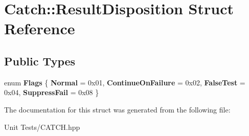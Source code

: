 \hypertarget{structCatch_1_1ResultDisposition}{}\section{Catch\+:\+:Result\+Disposition Struct Reference}
\label{structCatch_1_1ResultDisposition}
\subsection*{Public Types}
\begin{DoxyCompactItemize}
\item 
enum {\bfseries Flags} \{ {\bfseries Normal} = 0x01, 
{\bfseries Continue\+On\+Failure} = 0x02, 
{\bfseries False\+Test} = 0x04, 
{\bfseries Suppress\+Fail} = 0x08
 \}\hypertarget{structCatch_1_1ResultDisposition_a3396cad6e2259af326b3aae93e23e9d8}{}\label{structCatch_1_1ResultDisposition_a3396cad6e2259af326b3aae93e23e9d8}

\end{DoxyCompactItemize}


The documentation for this struct was generated from the following file\+:\begin{DoxyCompactItemize}
\item 
Unit Tests/C\+A\+T\+C\+H.\+hpp\end{DoxyCompactItemize}
